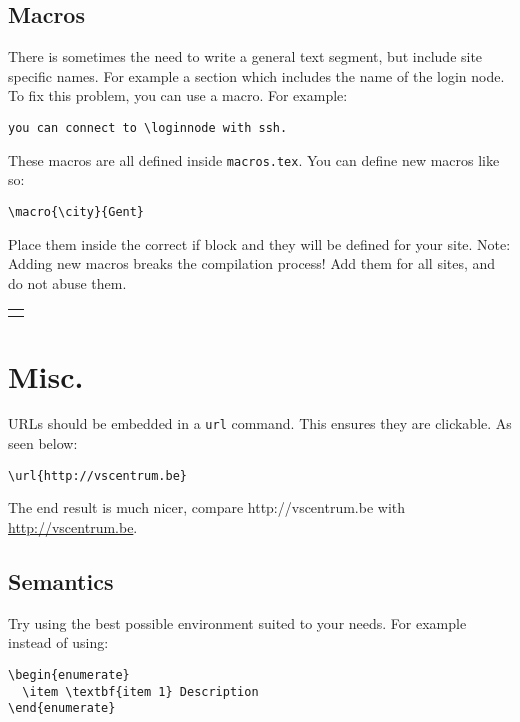 \documentclass[11pt,a4paper]{article}
\begin{document}
\subsection{Macros}
\label{sec:macros}

There is sometimes the need to write a general text segment, but include site
specific names. For example a section which includes the name of the login node.
To fix this problem, you can use a macro. For example:

\begin{verbatim}
you can connect to \loginnode with ssh.
\end{verbatim}

These macros are all defined inside \verb|macros.tex|. You can define new macros like so:
\begin{verbatim}
\macro{\city}{Gent}
\end{verbatim}

Place them inside the correct if block and they will be defined for your site.
Note: Adding new macros breaks the compilation process! Add them for all sites,
and do not abuse them.



\begin{tabular}{|c|} \hline
  \maketabularrow{\thecnt}
\end{tabular}

\section{Misc.}
\label{sec:misc}

URLs should be embedded in a \texttt{url} command. This ensures they are clickable. As seen below:
\begin{verbatim}
\url{http://vscentrum.be}
\end{verbatim}

The end result is much nicer, compare http://vscentrum.be with \url{http://vscentrum.be}.

\subsection{Semantics}

Try using the best possible environment suited to your needs. For example instead of using:
\begin{verbatim}
\begin{enumerate}
  \item \textbf{item 1} Description
\end{enumerate}
\end{verbatim}
\end{document}
